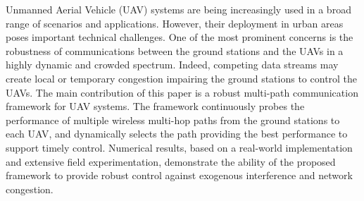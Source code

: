 Unmanned Aerial Vehicle (UAV) systems are being increasingly used in a broad range of scenarios and applications. However, their deployment in urban areas poses important technical challenges. One of the most prominent concerns is the robustness of communications between the ground stations and the UAVs in a highly dynamic and crowded spectrum. Indeed, competing data streams may create local or temporary congestion impairing the ground stations to control the UAVs.
The main contribution of this paper is a robust multi-path communication framework for UAV systems. The framework continuously probes the performance of multiple wireless multi-hop paths from the ground stations to each UAV, and dynamically selects the path providing the best performance to support timely control. Numerical results, based on a real-world implementation and extensive field experimentation, demonstrate the ability of the proposed framework to provide robust control against exogenous interference and network congestion.